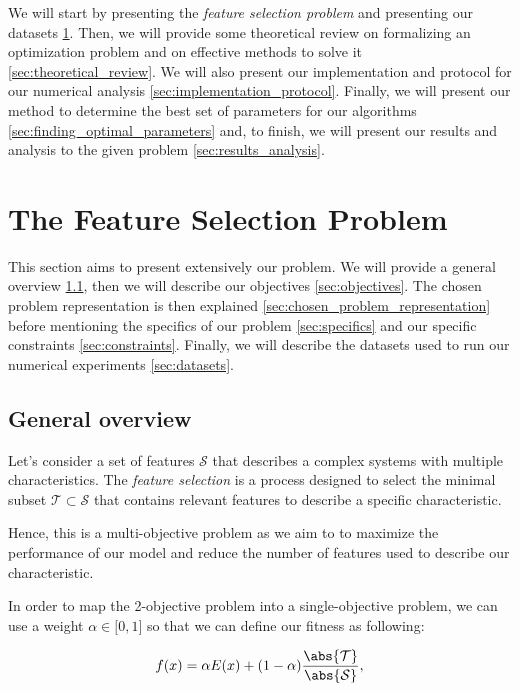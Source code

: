 \documentclass[12pt, openany]{article}
\begin{document}
We will start by presenting the \emph{feature selection problem} and presenting our datasets \ref{sec:fs}. Then, we will provide some theoretical review on formalizing an optimization problem and on effective methods to solve it \ref{sec:theoretical_review}. We will also present our implementation and protocol for our numerical analysis \ref{sec:implementation_protocol}. Finally, we will present our method to determine the best set of parameters for our algorithms \ref{sec:finding_optimal_parameters} and, to finish, we will present our results and analysis to the given problem \ref{sec:results_analysis}.

\section{The Feature Selection Problem}\label{sec:fs}

This section aims to present extensively our problem. We will provide a general overview \ref{sec:general_overview}, then we will describe our objectives \ref{sec:objectives}. The chosen problem representation is then explained \ref{sec:chosen_problem_representation} before mentioning the specifics of our problem \ref{sec:specifics} and our specific constraints \ref{sec:constraints}. Finally, we will describe the datasets used to run our numerical experiments \ref{sec:datasets}.

\subsection{General overview}\label{sec:general_overview}

Let's consider a set of features $\mathcal{S}$ that describes a complex systems with multiple characteristics. The \emph{feature selection} is a process designed to select the minimal subset $\mathcal{T} \subset \mathcal{S}$ that contains relevant features to describe a specific characteristic.

Hence, this is a multi-objective problem as we aim to to maximize the performance of our model and reduce the number of features used to describe our characteristic.

In order to map the 2-objective problem into a single-objective problem, we can use a weight $\alpha \in \lbrack 0,1 \rbrack$ so that we can define our fitness as following:

\begin{equation}\label{eq:objective_function_old}
    f(x) = \alpha E(x) + (1-\alpha) \frac{\abs{\mathcal{T}}}{\abs{\mathcal{S}}},
\end{equation}
\end{document}
